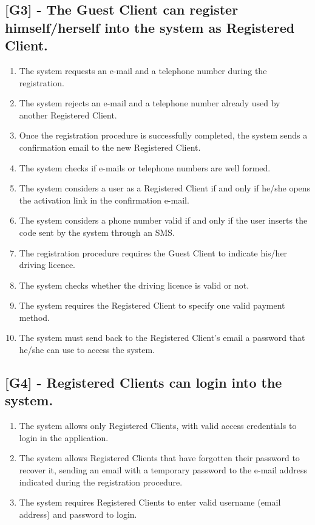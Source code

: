 \subsection{[G3] - The Guest Client can register himself/herself into the system as Registered Client.}
\begin{enumerate}[label=\textbf{R3.\arabic*)}]
\item The system requests an e-mail and a telephone number during the registration.
\item The system rejects an e-mail and a telephone number already used by another Registered Client.
\item Once the registration procedure is successfully completed, the system sends a confirmation email to the new Registered Client.
\item The system checks if e-mails or telephone numbers are well formed.
\item The system considers a user as a Registered Client if and only if he/she opens the activation link in the confirmation e-mail.
\item The system considers a phone number valid if and only if the user inserts the code sent by the system through an SMS.
\item The registration procedure requires the Guest Client to indicate his/her driving licence.
\item The system checks whether the driving licence is valid or not.
\item The system requires the Registered Client to specify one valid payment method.
\item The system must send back to the Registered Client’s email a password that he/she can use to access the system.
\end{enumerate}

\subsection{[G4] - Registered Clients can login into the system.}
\begin{enumerate}[label=\textbf{R4.\arabic*)}]
\item The system allows only Registered Clients, with valid access credentials to login in the application.
\item The system allows Registered Clients that have forgotten their password to recover it, sending an email with a temporary password to the e-mail address indicated during the registration procedure.
\item The system requires Registered Clients to enter valid username (email address) and password to login.
\end{enumerate}


